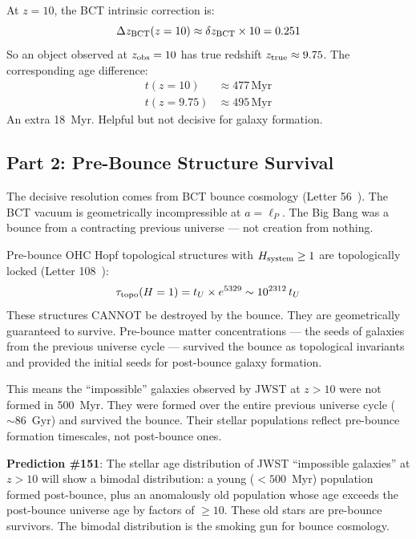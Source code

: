 \documentclass[twocolumn,10pt]{article}
\begin{document}
At $z = 10$, the BCT intrinsic correction is:
%
\begin{equation}
\Delta z_{\rm BCT}(z=10) \approx \delta z_{\rm BCT} \times 10 = 0.251
\end{equation}
%
So an object observed at $z_{\rm obs} = 10$ has true redshift
$z_{\rm true} \approx 9.75$. The corresponding age difference:
%
\begin{align}
t(z=10) &\approx 477\,\text{Myr} \\
t(z=9.75) &\approx 495\,\text{Myr}
\end{align}
%
An extra 18~Myr. Helpful but not decisive for galaxy formation.

\subsection{Part 2: Pre-Bounce Structure Survival}

The decisive resolution comes from BCT bounce cosmology
(Letter 56~\cite{bct_l56}). The BCT vacuum is geometrically
incompressible at $a = \ell_P$. The Big Bang was a bounce
from a contracting previous universe --- not creation from
nothing.

Pre-bounce OHC Hopf topological structures with $H_{\rm system} \geq 1$
are topologically locked (Letter 108~\cite{bct_l108}):
%
\begin{equation}
\tau_{\rm topo}(H=1) = t_U \times e^{5329} \sim 10^{2312}\,t_U
\end{equation}
%
These structures CANNOT be destroyed by the bounce. They are
geometrically guaranteed to survive. Pre-bounce matter
concentrations --- the seeds of galaxies from the previous
universe cycle --- survived the bounce as topological
invariants and provided the initial seeds for post-bounce
galaxy formation.

This means the ``impossible'' galaxies observed by JWST at
$z > 10$ were not formed in 500~Myr. They were formed over the
entire previous universe cycle ($\sim 86$~Gyr) and survived
the bounce. Their stellar populations reflect pre-bounce
formation timescales, not post-bounce ones.

\textbf{Prediction \#151}: The stellar age distribution of
JWST ``impossible galaxies'' at $z > 10$ will show a bimodal
distribution: a young ($< 500$~Myr) population formed
post-bounce, plus an anomalously old population whose
age exceeds the post-bounce universe age by factors of
$\geq 10$. These old stars are pre-bounce survivors.
The bimodal distribution is the smoking gun for bounce
cosmology.
\end{document}
